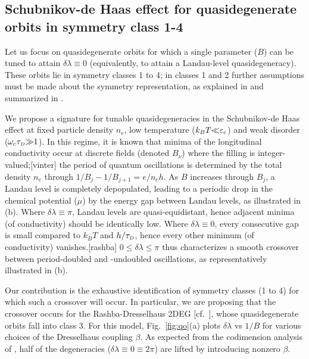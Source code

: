 \documentclass[aps, prb, showpacs, twocolumn, notitlepage, superscriptaddress]{revtex4-1}
\begin{document}

\subsection{Schubnikov-de Haas effect for quasidegenerate orbits in symmetry class 1-4}\label{sec:quantosc_quasideg}

Let us focus on quasidegenerate orbits for which a single parameter ($B$) can be tuned to attain $\delta \lambda{\equiv}0$ (equivalently, to attain a Landau-level quasidegeneracy). These orbits lie in symmetry classes 1 to 4; in classes 1 and 2 further assumptions must be made about the symmetry representation, as explained in  and summarized in .

We propose a signature for tunable quasidegeneracies in the  Schubnikov-de Haas effect at fixed particle density $n_e$, low temperature ($k_BT{\ll}\varepsilon_c$) and weak disorder ($\omega_c\tau_{\scriptscriptstyle{D}}{\gg}1$).
In this regime, it is known that minima of the longitudinal conductivity occur at discrete fields (denoted $B_{\nu}$)  where the filling is integer-valued;[vinter] the period of quantum oscillations is determined by the total density $n_e$ through $1/B_j{-}1/B_{j+1}{=}e/n_eh$. As $B$ increases through $B_j$, a Landau level is completely depopulated, leading to a periodic drop in the chemical potential ($\mu$) by the energy gap  between Landau levels, as illustrated in (b). Where $\delta\lambda{\equiv}\pi$, Landau levels are  quasi-equidistant, hence adjacent minima (of conductivity) should be identically low. Where $\delta\lambda{\equiv}0$, every consecutive gap is small compared to $k_BT$ and $h/\tau_{\scriptscriptstyle{D}}$, hence every other  minimum (of conductivity) vanishes.[rashba] $0{\leq}\delta\lambda{\leq}{\pi}$ thus characterizes a smooth crossover between period-doubled and -undoubled oscillations, as representatively illustrated in (b).


Our contribution is the exhaustive  identification of symmetry classes (1 to 4) for which such a crossover will occur. In particular, we are proposing that the crossover occurs for the Rashba-Dresselhaus 2DEG [cf.\ ], whose quasidegenerate orbits fall into class 3. For this model,  Fig.\ \ref{fig:qo}(a) plots $\delta \lambda$ vs $1/B$ for various choices of the Dresselhaus coupling $\beta$. As expected from the codimension analysis of , half of the degeneracies ($\delta\lambda {\equiv}0{\equiv}2\pi$) are lifted by introducing nonzero $\beta$. 
\end{document}
